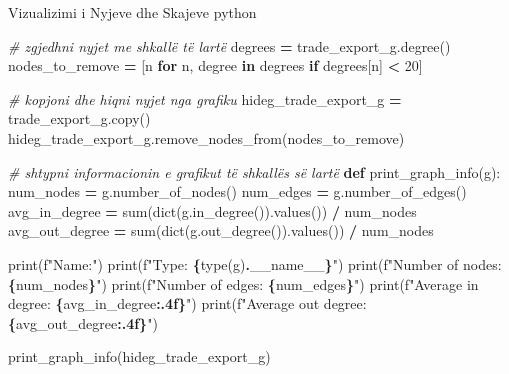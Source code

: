 \documentclass[
  ignorenonframetext,
]{beamer}
\newenvironment{Shaded}{\begin{snugshade}}{\end{snugshade}}
\newcommand{\BuiltInTok}[1]{#1}
\newcommand{\CommentTok}[1]{\textcolor[rgb]{0.56,0.35,0.01}{\textit{#1}}}
\newcommand{\ControlFlowTok}[1]{\textcolor[rgb]{0.13,0.29,0.53}{\textbf{#1}}}
\newcommand{\DecValTok}[1]{\textcolor[rgb]{0.00,0.00,0.81}{#1}}
\newcommand{\KeywordTok}[1]{\textcolor[rgb]{0.13,0.29,0.53}{\textbf{#1}}}
\newcommand{\NormalTok}[1]{#1}
\newcommand{\OperatorTok}[1]{\textcolor[rgb]{0.81,0.36,0.00}{\textbf{#1}}}
\newcommand{\SpecialCharTok}[1]{\textcolor[rgb]{0.81,0.36,0.00}{\textbf{#1}}}
\newcommand{\SpecialStringTok}[1]{\textcolor[rgb]{0.31,0.60,0.02}{#1}}
\newcommand{\VariableTok}[1]{\textcolor[rgb]{0.00,0.00,0.00}{#1}}
\begin{document}
\begin{frame}[fragile]{Vizualizimi i Nyjeve dhe Skajeve}
\protect\hypertarget{vizualizimi-i-nyjeve-dhe-skajeve-4}{}
python

\begin{Shaded}
\begin{Highlighting}[]
\CommentTok{\# zgjedhni nyjet me shkallë të lartë}
\NormalTok{degrees }\OperatorTok{=}\NormalTok{ trade\_export\_g.degree()}
\NormalTok{nodes\_to\_remove }\OperatorTok{=}\NormalTok{ [n }\ControlFlowTok{for}\NormalTok{ n, degree }\KeywordTok{in}\NormalTok{ degrees }\ControlFlowTok{if}\NormalTok{ degrees[n] }\OperatorTok{\textless{}} \DecValTok{20}\NormalTok{]}

\CommentTok{\# kopjoni dhe hiqni nyjet nga grafiku}
\NormalTok{hideg\_trade\_export\_g }\OperatorTok{=}\NormalTok{ trade\_export\_g.copy()}
\NormalTok{hideg\_trade\_export\_g.remove\_nodes\_from(nodes\_to\_remove)}

\CommentTok{\# shtypni informacionin e grafikut të shkallës së lartë}
\KeywordTok{def}\NormalTok{ print\_graph\_info(g):}
\NormalTok{    num\_nodes }\OperatorTok{=}\NormalTok{ g.number\_of\_nodes()}
\NormalTok{    num\_edges }\OperatorTok{=}\NormalTok{ g.number\_of\_edges()}
\NormalTok{    avg\_in\_degree }\OperatorTok{=} \BuiltInTok{sum}\NormalTok{(}\BuiltInTok{dict}\NormalTok{(g.in\_degree()).values()) }\OperatorTok{/}\NormalTok{ num\_nodes}
\NormalTok{    avg\_out\_degree }\OperatorTok{=} \BuiltInTok{sum}\NormalTok{(}\BuiltInTok{dict}\NormalTok{(g.out\_degree()).values()) }\OperatorTok{/}\NormalTok{ num\_nodes}

    \BuiltInTok{print}\NormalTok{(}\SpecialStringTok{f"Name:"}\NormalTok{)}
    \BuiltInTok{print}\NormalTok{(}\SpecialStringTok{f"Type: }\SpecialCharTok{\{}\BuiltInTok{type}\NormalTok{(g)}\SpecialCharTok{.}\VariableTok{\_\_name\_\_}\SpecialCharTok{\}}\SpecialStringTok{"}\NormalTok{)}
    \BuiltInTok{print}\NormalTok{(}\SpecialStringTok{f"Number of nodes: }\SpecialCharTok{\{}\NormalTok{num\_nodes}\SpecialCharTok{\}}\SpecialStringTok{"}\NormalTok{)}
    \BuiltInTok{print}\NormalTok{(}\SpecialStringTok{f"Number of edges: }\SpecialCharTok{\{}\NormalTok{num\_edges}\SpecialCharTok{\}}\SpecialStringTok{"}\NormalTok{)}
    \BuiltInTok{print}\NormalTok{(}\SpecialStringTok{f"Average in degree: }\SpecialCharTok{\{}\NormalTok{avg\_in\_degree}\SpecialCharTok{:.4f\}}\SpecialStringTok{"}\NormalTok{)}
    \BuiltInTok{print}\NormalTok{(}\SpecialStringTok{f"Average out degree: }\SpecialCharTok{\{}\NormalTok{avg\_out\_degree}\SpecialCharTok{:.4f\}}\SpecialStringTok{"}\NormalTok{)}

\NormalTok{print\_graph\_info(hideg\_trade\_export\_g)}
\end{Highlighting}
\end{Shaded}
\end{frame}
\end{document}
